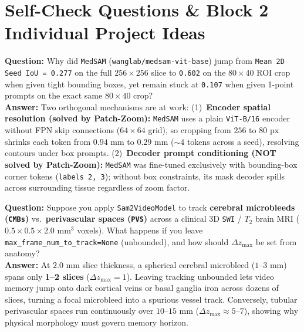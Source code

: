 \documentclass[10.5pt,a4paper]{article}
\begin{document}
\section{Self-Check Questions \& Block 2 Individual Project Ideas}

\begin{qabox}
\textbf{Question:} Why did \texttt{MedSAM} (\texttt{wanglab/medsam-vit-base}) jump from \texttt{Mean 2D Seed IoU = 0.277} on the full $256 \times 256$ slice to \texttt{0.602} on the $80 \times 40$ ROI crop when given tight bounding boxes, yet remain stuck at \texttt{0.107} when given 1-point prompts on the exact same $80 \times 40$ crop?\\[3pt]
\textbf{Answer:} Two orthogonal mechanisms are at work: (1)~\textbf{Encoder spatial resolution (solved by Patch-Zoom):} \texttt{MedSAM} uses a plain \texttt{ViT-B/16} encoder without FPN skip connections ($64\times 64$ grid), so cropping from $256$ to $80\text{ px}$ shrinks each token from $0.94\text{ mm}$ to $0.29\text{ mm}$ ($\sim 4$ tokens across a seed), resolving contours under box prompts. (2)~\textbf{Decoder prompt conditioning (NOT solved by Patch-Zoom):} \texttt{MedSAM} was fine-tuned exclusively with bounding-box corner tokens (\texttt{labels 2, 3}); without box constraints, its mask decoder spills across surrounding tissue regardless of zoom factor.
\end{qabox}

\begin{qabox}
\textbf{Question:} Suppose you apply \texttt{Sam2VideoModel} to track \textbf{cerebral microbleeds (\texttt{CMBs})} vs.\ \textbf{perivascular spaces (\texttt{PVS})} across a clinical 3D \texttt{SWI} / $T_2$ brain MRI ($0.5 \times 0.5 \times 2.0\text{ mm}^3$ voxels). What happens if you leave \texttt{max\_frame\_num\_to\_track=None} (unbounded), and how should $\Delta z_{\max}$ be set from anatomy?\\[3pt]
\textbf{Answer:} At $2.0\text{ mm}$ slice thickness, a spherical cerebral microbleed ($1\text{--}3\text{ mm}$) spans only \textbf{1--2 slices} ($\Delta z_{\max} = 1$). Leaving tracking unbounded lets video memory jump onto dark cortical veins or basal ganglia iron across dozens of slices, turning a focal microbleed into a spurious vessel track. Conversely, tubular perivascular spaces run continuously over $10\text{--}15\text{ mm}$ ($\Delta z_{\max} \approx 5\text{--}7$), showing why physical morphology must govern memory horizon.
\end{qabox}
\end{document}

